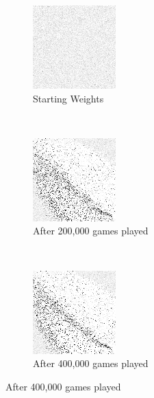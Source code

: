 
\begin{figure}
\center

	\begin{subfigure}[t]{0.2\textwidth}
	\includegraphics[width=\stratgraphwidth]{images/findings/round1/flipbook_a.png}
	\caption{Starting Weights}
	\end{subfigure}
	~
	\begin{subfigure}[t]{0.2\textwidth}
	\includegraphics[width=\stratgraphwidth]{images/findings/round1/flipbook_b.png}
	\caption{After 200,000 games played}
	\end{subfigure}
	~
	\begin{subfigure}[t]{0.2\textwidth}
	\includegraphics[width=\stratgraphwidth]{images/findings/round1/flipbook_c.png}
	\caption{After 400,000 games played}
	\end{subfigure}


\end{figure}
